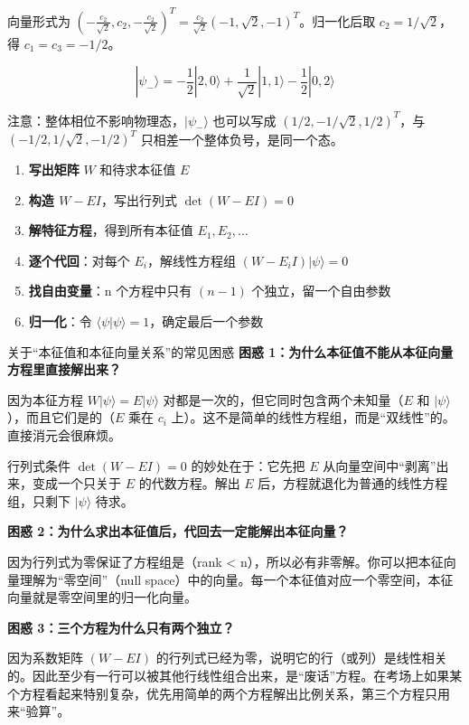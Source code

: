 向量形式为 $(-\frac{c_2}{\sqrt{2}}, c_2, -\frac{c_2}{\sqrt{2}})^T = \frac{c_2}{\sqrt{2}}(-1, \sqrt{2}, -1)^T$。归一化后取 $c_2 = 1/\sqrt{2}$，得 $c_1 = c_3 = -1/2$。

\[
\boxed{|\psi_-\rangle = -\frac{1}{2}|2,0\rangle + \frac{1}{\sqrt{2}}|1,1\rangle - \frac{1}{2}|0,2\rangle}
\]

注意：整体相位不影响物理态，$|\psi_-\rangle$ 也可以写成 $(1/2, -1/\sqrt{2}, 1/2)^T$，与 $(-1/2, 1/\sqrt{2}, -1/2)^T$ 只相差一个整体负号，是同一个态。

\begin{thinkbox}
\begin{enumerate}
    \item \textbf{写出矩阵} $W$ 和待求本征值 $E$
    \item \textbf{构造 $W - EI$}，写出行列式 $\det(W - EI) = 0$
    \item \textbf{解特征方程}，得到所有本征值 $E_1, E_2, \dots$
    \item \textbf{逐个代回}：对每个 $E_i$，解线性方程组 $(W - E_i I)|\psi\rangle = 0$
    \item \textbf{找自由变量}：n 个方程中只有 $(n-1)$ 个独立，留一个自由参数
    \item \textbf{归一化}：令 $\langle\psi|\psi\rangle = 1$，确定最后一个参数
\end{enumerate}
\end{thinkbox}

\begin{errorbox}[colback=white]{关于``本征值和本征向量关系''的常见困惑}
\textbf{困惑 1：为什么本征值不能从本征向量方程里直接解出来？}

因为本征方程 $W|\psi\rangle = E|\psi\rangle$ 对都是一次的，但它同时包含两个未知量（$E$ 和 $|\psi\rangle$），而且它们是的（$E$ 乘在 $c_i$ 上）。这不是简单的线性方程组，而是``双线性''的。直接消元会很麻烦。

行列式条件 $\det(W - EI) = 0$ 的妙处在于：它先把 $E$ 从向量空间中``剥离''出来，变成一个只关于 $E$ 的代数方程。解出 $E$ 后，方程就退化为普通的线性方程组，只剩下 $|\psi\rangle$ 待求。

\textbf{困惑 2：为什么求出本征值后，代回去一定能解出本征向量？}

因为行列式为零保证了方程组是（rank < n），所以必有非零解。你可以把本征向量理解为``零空间''（null space）中的向量。每一个本征值对应一个零空间，本征向量就是零空间里的归一化向量。

\textbf{困惑 3：三个方程为什么只有两个独立？}

因为系数矩阵 $(W - EI)$ 的行列式已经为零，说明它的行（或列）是线性相关的。因此至少有一行可以被其他行线性组合出来，是``废话''方程。在考场上如果某个方程看起来特别复杂，优先用简单的两个方程解出比例关系，第三个方程只用来``验算''。
\end{errorbox}

